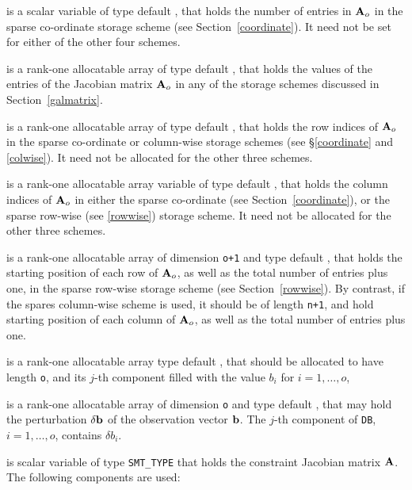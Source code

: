 \documentclass{galahad}
\begin{document}
\begin{description}
\begin{description}
 is a scalar variable of type default \integer, that 
holds the number of entries in ${\mathbf{A}}_o$
in the sparse co-ordinate storage scheme (see Section~\ref{coordinate}). 
It need not be set for either of the other four schemes.

 is a rank-one allocatable array of type default \realdp, that 
holds
the values of the entries of the Jacobian matrix ${\mathbf{A}}_o$ in any of the 
storage schemes discussed in Section~\ref{galmatrix}.

 is a rank-one allocatable array of type default \integer,
that holds the row indices of ${\mathbf{A}}_o$ in the sparse co-ordinate 
or column-wise storage schemes (see \S\ref{coordinate} and \ref{colwise}).
It need not be allocated for the other three schemes.

 is a rank-one allocatable array variable of type default \integer,
that holds the column indices of ${\mathbf{A}}_o$ in either the sparse co-ordinate 
(see Section~\ref{coordinate}), or the sparse row-wise 
(see \ref{rowwise}) storage scheme.
It need not be allocated for the other three schemes.

 is a rank-one allocatable array of dimension {\tt o+1} and type 
default \integer, that holds the 
starting position of each row of ${\mathbf{A}}_o$, as well
as the total number of entries plus one, in the sparse row-wise storage
scheme (see Section~\ref{rowwise}). By contrast, if the spares column-wise 
scheme is used, it should be of length {\tt n+1}, and hold
starting position of each column of ${\mathbf{A}}_o$, as well
as the total number of entries plus one.
\end{description}

 is a rank-one allocatable array type default \realdp, that 
should be allocated to have length {\tt o}, and its $j$-th component 
filled with the value $b_{i}$ for $i = 1, \ldots , o$, 

 is a rank-one allocatable array of dimension {\tt o} and type 
default \realdp, that may hold the perturbation $\delta {\mathbf{b}}$ 
of the observation vector ${\mathbf{b}}$.
The $j$-th component of 
{\tt DB}, $i = 1,  \ldots ,  o$, contains $\delta b_{i}$.

 is scalar variable of type {\tt SMT\_TYPE} that holds the constraint 
Jacobian matrix ${\mathbf{A}}$. The following components are used:

\begin{description}


\end{description}
\end{description}
\end{document}
